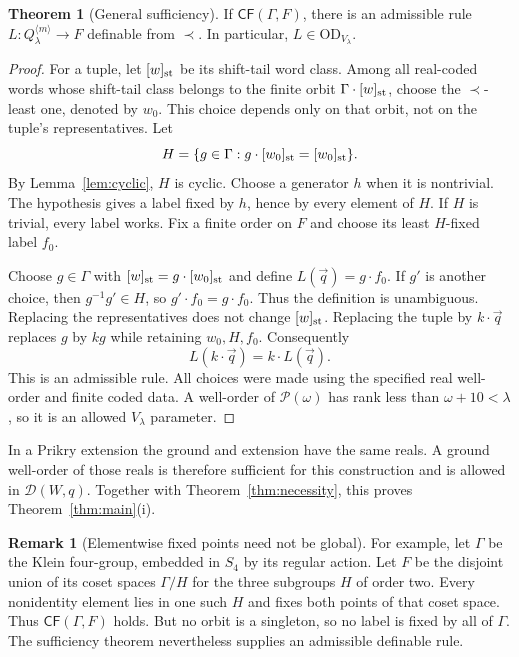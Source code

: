 \documentclass[11pt,letterpaper]{article}
\theoremstyle{definition}
\newtheorem{theorem}[definition]{Theorem}
\newtheorem{remark}[definition]{Remark}
\numberwithin{equation}{section}
\newcommand{\OD}{\mathrm{OD}}
\newcommand{\CF}{\mathsf{CF}}
\newcommand{\DD}{\mathscr D}
\begin{document}
\begin{theorem}[General sufficiency]\label{thm:sufficiency}
If $\CF(\Gamma,F)$, there is an admissible rule $L:Q_\lambda^{\langle m\rangle}\to F$ definable from $\prec$. In particular, $L\in\OD_{V_\lambda}$.
\end{theorem}
\begin{proof}
For a tuple, let $[w]_{\rm st}$ be its shift-tail word class. Among all real-coded words whose shift-tail class belongs to the finite orbit $\Gamma\cdot[w]_{\rm st}$, choose the $\prec$-least one, denoted by $w_0$. This choice depends only on that orbit, not on the tuple's representatives. Let
\[
 H=\{g\in\Gamma:g\cdot[w_0]_{\rm st}=[w_0]_{\rm st}\}.
\]
By Lemma~\ref{lem:cyclic}, $H$ is cyclic. Choose a generator $h$ when it is nontrivial. The hypothesis gives a label fixed by $h$, hence by every element of $H$. If $H$ is trivial, every label works. Fix a finite order on $F$ and choose its least $H$-fixed label $f_0$.

Choose $g\in\Gamma$ with $[w]_{\rm st}=g\cdot[w_0]_{\rm st}$ and define $L(\vec q)=g\cdot f_0$. If $g'$ is another choice, then $g^{-1}g'\in H$, so $g'\cdot f_0=g\cdot f_0$. Thus the definition is unambiguous. Replacing the representatives does not change $[w]_{\rm st}$. Replacing the tuple by $k\cdot\vec q$ replaces $g$ by $kg$ while retaining $w_0,H,f_0$. Consequently
\[
 L(k\cdot\vec q)=k\cdot L(\vec q).
\]
This is an admissible rule. All choices were made using the specified real well-order and finite coded data. A well-order of $\mathcal P(\omega)$ has rank less than $\omega+10<\lambda$, so it is an allowed $V_\lambda$ parameter.
\end{proof}

In a Prikry extension the ground and extension have the same reals. A ground well-order of those reals is therefore sufficient for this construction and is allowed in $\DD(W,q)$. Together with Theorem~\ref{thm:necessity}, this proves Theorem~\ref{thm:main}(i).

\begin{remark}[Elementwise fixed points need not be global]
For example, let $\Gamma$ be the Klein four-group, embedded in $S_4$ by its regular action. Let $F$ be the disjoint union of its coset spaces $\Gamma/H$ for the three subgroups $H$ of order two. Every nonidentity element lies in one such $H$ and fixes both points of that coset space. Thus $\CF(\Gamma,F)$ holds. But no orbit is a singleton, so no label is fixed by all of $\Gamma$. The sufficiency theorem nevertheless supplies an admissible definable rule.
\end{remark}
\end{document}
